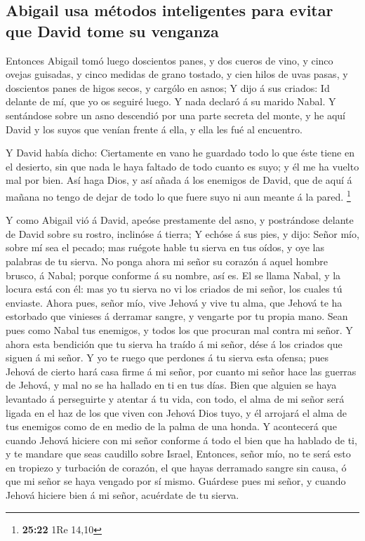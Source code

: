 \hypertarget{abigail-usa-muxe9todos-inteligentes-para-evitar-que-david-tome-su-venganza}{%
\subsection{Abigail usa métodos inteligentes para evitar que David tome
su
venganza}\label{abigail-usa-muxe9todos-inteligentes-para-evitar-que-david-tome-su-venganza}}

 Entonces Abigail tomó luego doscientos panes, y dos cueros
de vino, y cinco ovejas guisadas, y cinco medidas de grano tostado, y
cien hilos de uvas pasas, y doscientos panes de higos secos, y cargólo
en asnos;  Y dijo á sus criados: Id delante de mí, que yo
os seguiré luego. Y nada declaró á su marido Nabal.  Y
sentándose sobre un asno descendió por una parte secreta del monte, y he
aquí David y los suyos que venían frente á ella, y ella les fué al
encuentro.

 Y David había dicho: Ciertamente en vano he guardado todo
lo que éste tiene en el desierto, sin que nada le haya faltado de todo
cuanto es suyo; y él me ha vuelto mal por bien.  Así haga
Dios, y así añada á los enemigos de David, que de aquí á mañana no tengo
de dejar de todo lo que fuere suyo ni aun meante á la pared. \footnote{\textbf{25:22}
  1Re 14,10}

 Y como Abigail vió á David, apeóse prestamente del asno, y
postrándose delante de David sobre su rostro, inclinóse á tierra;
 Y echóse á sus pies, y dijo: Señor mío, sobre mí sea el
pecado; mas ruégote hable tu sierva en tus oídos, y oye las palabras de
tu sierva.  No ponga ahora mi señor su corazón á aquel
hombre brusco, á Nabal; porque conforme á su nombre, así es. El se llama
Nabal, y la locura está con él: mas yo tu sierva no vi los criados de mi
señor, los cuales tú enviaste.  Ahora pues, señor mío, vive
Jehová y vive tu alma, que Jehová te ha estorbado que vinieses á
derramar sangre, y vengarte por tu propia mano. Sean pues como Nabal tus
enemigos, y todos los que procuran mal contra mi señor.  Y
ahora esta bendición que tu sierva ha traído á mi señor, dése á los
criados que siguen á mi señor.  Y yo te ruego que perdones
á tu sierva esta ofensa; pues Jehová de cierto hará casa firme á mi
señor, por cuanto mi señor hace las guerras de Jehová, y mal no se ha
hallado en ti en tus días.  Bien que alguien se haya
levantado á perseguirte y atentar á tu vida, con todo, el alma de mi
señor será ligada en el haz de los que viven con Jehová Dios tuyo, y él
arrojará el alma de tus enemigos como de en medio de la palma de una
honda.  Y acontecerá que cuando Jehová hiciere con mi señor
conforme á todo el bien que ha hablado de ti, y te mandare que seas
caudillo sobre Israel,  Entonces, señor mío, no te será
esto en tropiezo y turbación de corazón, el que hayas derramado sangre
sin causa, ó que mi señor se haya vengado por sí mismo. Guárdese pues mi
señor, y cuando Jehová hiciere bien á mi señor, acuérdate de tu sierva.

